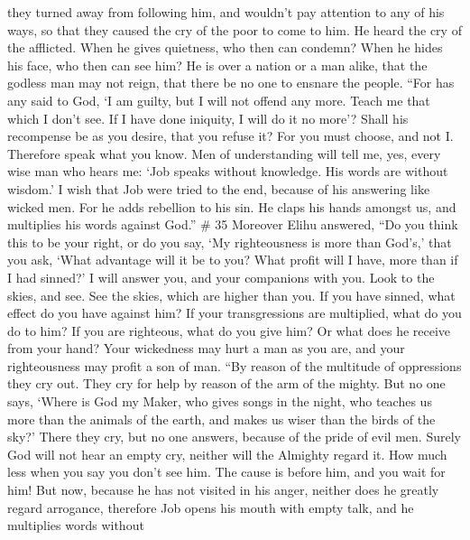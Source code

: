 they turned away from following him, and wouldn't pay attention to any
of his ways,  so that they caused the cry of the poor to
come to him. He heard the cry of the afflicted.  When he
gives quietness, who then can condemn? When he hides his face, who then
can see him? He is over a nation or a man alike,  that the
godless man may not reign, that there be no one to ensnare the people.
 ``For has any said to God, `I am guilty, but I will not
offend any more.  Teach me that which I don't see. If I
have done iniquity, I will do it no more'?  Shall his
recompense be as you desire, that you refuse it? For you must choose,
and not I. Therefore speak what you know.  Men of
understanding will tell me, yes, every wise man who hears me:
 `Job speaks without knowledge. His words are without
wisdom.'  I wish that Job were tried to the end, because of
his answering like wicked men.  For he adds rebellion to
his sin. He claps his hands amongst us, and multiplies his words against
God.'' \# 35  Moreover Elihu answered,  ``Do you
think this to be your right, or do you say, `My righteousness is more
than God's,'  that you ask, `What advantage will it be to
you? What profit will I have, more than if I had sinned?'  I
will answer you, and your companions with you.  Look to the
skies, and see. See the skies, which are higher than you. 
If you have sinned, what effect do you have against him? If your
transgressions are multiplied, what do you do to him?  If
you are righteous, what do you give him? Or what does he receive from
your hand?  Your wickedness may hurt a man as you are, and
your righteousness may profit a son of man.  ``By reason of
the multitude of oppressions they cry out. They cry for help by reason
of the arm of the mighty.  But no one says, `Where is God
my Maker, who gives songs in the night,  who teaches us
more than the animals of the earth, and makes us wiser than the birds of
the sky?'  There they cry, but no one answers, because of
the pride of evil men.  Surely God will not hear an empty
cry, neither will the Almighty regard it.  How much less
when you say you don't see him. The cause is before him, and you wait
for him!  But now, because he has not visited in his anger,
neither does he greatly regard arrogance,  therefore Job
opens his mouth with empty talk, and he multiplies words without
